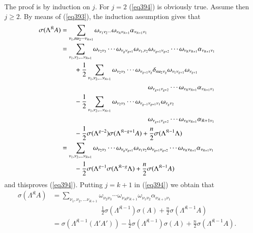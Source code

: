 The proof is by induction on $j$. For $j= 2$ (\ref{eq394}) is obviously
true. Assume then $j \ge 2$. By means of (\ref{eq393}), the induction
assumption  gives that 
\begin{align*}
\sigma (\Lambda^{\mathfrak{K}} A) & = \sum_{\nu_1, nu_2 \cdots
  \nu_{\mathfrak{K}+1}} \omega_{\nu_1 \nu_2 \cdots}
\omega_{\nu_\mathfrak{K} \nu_{\mathfrak{K}+1}}
\alpha_{\nu_{\mathfrak{K}+1}\nu_1}\\ 
& = \sum_{\nu_1, \nu_2, \ldots \nu_{\mathfrak{K}+1}} \omega_{\nu_2
  \nu_3} \cdots \omega_{\nu_g \nu_{g + 1}} \omega_{\nu_1,\nu_2}
\omega_{\nu_{g+1} \nu_{g+2} } \cdots \omega_{\nu_\mathfrak{K}
  \nu_{\mathfrak{K}+1}} \alpha_{\nu_{\mathfrak{K}+1} \nu_1}\\ 
& \qquad + \frac{1}{2}\sum_{\nu_1, \nu_2, \ldots \nu_{\mathfrak{K}+1}}
\omega_{\nu_2 \nu_3} \cdots \omega_{\nu_{g+1} \nu_g }  \delta_{nu_2
  \nu_g} \omega_{\nu_1 \nu_{g+1}} \omega_{\nu_{g+1}}\\
& \hspace{4.5cm}
\omega_{\nu_{g+1}\nu_{g+2}} \cdots \omega_{\nu_\mathfrak{K}
  \nu_{\mathfrak{K}+1}} \alpha_{\nu_{\mathfrak{K}+1}\nu_1}\\ 
& \qquad -\frac{1}{2} \sum_{\nu_1, \nu_2, \ldots \nu_{\mathfrak{K}+1}}
\omega_{\nu_2 \nu_3} \cdots \omega_{\nu_{g-1} \nu_{g + 1}\nu_1}
\omega_{\nu_g \nu_2} \\
& \hspace{4.5cm} \omega_{\nu_{g+1} \nu_{g+2}} \cdots \omega
_{\nu_\mathfrak{K} \nu_{\mathfrak{K}+1}}  \alpha_{{\mathfrak{K}+1}
  \nu_1} \\ 
& \qquad  - \frac{1}{2} \sigma (\Lambda^{g-2}) \sigma
(\Lambda^{\mathfrak{K}-g+1} A) + \frac{n}{2} \sigma
(\Lambda^{\mathfrak{K}-1} \Lambda)\\ 
& = \sum_{\nu_1, \nu_2, \ldots \nu_{\mathfrak{K}+1}} \omega_{\nu_2
  \nu_3} \cdots \omega_{\nu_g \nu_{g+1} }  \omega_{\nu_1 \nu_2 }
\omega_{\nu_{g+1} \nu_{g+2}} \cdots
\omega_{\nu_\mathfrak{K}\nu_{\mathfrak{K}+1}}
\alpha_{\nu_{\mathfrak{K}+1} \nu_1}\\ 
& \qquad - \frac{1}{2} \sigma (\Lambda^{g-1}
\sigma(\Lambda^{\mathfrak{K}-g} \Lambda) + \frac{n}{2} \sigma
(\Lambda^{\mathfrak{K}-1} A)  
\end{align*}
and this\pageoriginale proves (\ref{eq394}). Putting $j = k
+ 1$ in 
(\ref{eq394}) we obtain that   
\begin{align*}
\sigma (\Lambda^\mathfrak{K} A) & = \sum_{\nu_1, \nu_2, \ldots
  \nu_{\mathfrak{K}+1}} \omega_{\nu_2 \nu_3} \cdots
\omega_{\nu_\mathfrak{K} \nu_{\mathfrak{K}+1}} \omega_{\nu_1 \nu_2}
\alpha_{\nu_{\mathfrak{K}+1} \nu_1}\\
& \hspace{3cm} \frac{1}{2} \sigma
(\Lambda^{\mathfrak{K}-1} ) \sigma (A) + \frac{n}{2} \sigma
(\Lambda^{\mathfrak{K}-1} A)\\ 
& = \sigma (\Lambda^{\mathfrak{K}-1} (\Lambda' A')) - \frac{1}{2}
\sigma (\Lambda^{\mathfrak{K}-1}) \sigma (A) + \frac{n}{2} \sigma
(\Lambda^{\mathfrak{K}-1} A). 
\end{align*}

